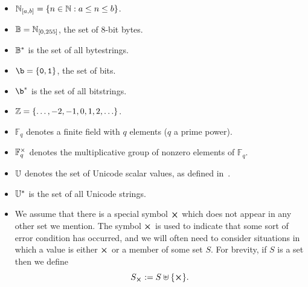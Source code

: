 \begin{itemize}
  \item $\mathbb{N}_{[a,b]} = \{n \in \mathbb{N}: a \leq n \leq b\}$.%

  \item $\mathbb{B} = \mathbb{N}_{[0,255]}$, the set of 8-bit bytes.%

  \item $\mathbb{B}^*$ is the set of all bytestrings.%

  \item $\b = \{\mathtt{0}, \mathtt{1}\}$, the set of bits.%

  \item $\b^*$ is the set of all bitstrings.%

  \item $\mathbb{Z} = \{\ldots, -2, -1, 0, 1, 2, \ldots\}$.%

  \item $\mathbb{F}_q$ denotes a finite field with $q$ elements ($q$ a prime power).%

  \item $\mathbb{F}_q^{\times}$ denotes the multiplicative group of nonzero elements of $\mathbb{F}_q$.%

  \item $\mathbb{U}$ denotes the set of Unicode scalar values, as defined in~\cite[Definition D76]{Unicode-standard}.%

  \item $\mathbb{U}^*$ is the set of all Unicode strings.%

  \item We assume that there is a special symbol $\errorX$ which does not appear
    in any other set we mention.  The symbol $\errorX$ is used to indicate that
    some sort of error condition has occurred, and we will often need to consider
    situations in which a value is either $\errorX$ or a member of some set $S$.
    For brevity, if $S$ is a set then we define
    $$
    \withError{S} := S \disj \{\errorX\}.
    $$%
\end{itemize}%


